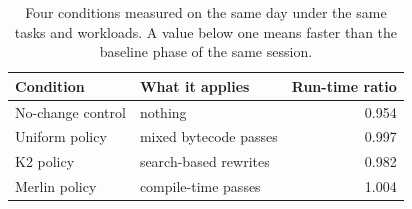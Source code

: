 \begin{table}[t]
\footnotesize
\centering
\caption{Four conditions measured on the same day under the same tasks and workloads. A value below one means faster than the baseline phase of the same session.}
\label{tab:sameday}
\begin{tabular}{llr}
\hline
Condition & What it applies & Run-time ratio \\
\hline
No-change control & nothing & 0.954 \\
Uniform policy & mixed bytecode passes & 0.997 \\
K2 policy & search-based rewrites~\cite{xu2021synthesizing} & 0.982 \\
Merlin policy & compile-time passes~\cite{mao2024merlin} & 1.004 \\
\hline
\end{tabular}
\end{table}

